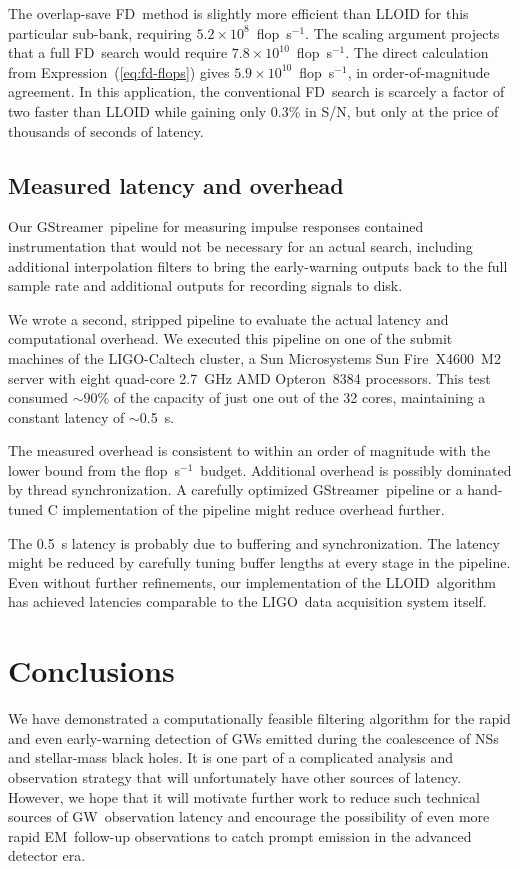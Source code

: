 \documentclass[preprint2]{aastex}
\newcommand{\NS}{NS}
\newcommand{\GW}{GW}%
\newcommand{\EM}{EM}%
\newcommand{\LIGO}{LIGO}%
\newcommand{\SNR}{S/N}%
\newcommand{\flops}{flop~s$^{-1}$}
\newcommand{\gstreamer}{GStreamer}
\newcommand{\lloid}{LLOID}%
\newcommand{\FD}{FD}%
\begin{document}
The overlap-save \FD\ method is slightly more efficient than LLOID for this particular sub-bank, requiring $5.2 \times 10^8$~\flops.  The scaling argument projects that a full \FD\ search would require $7.8 \times 10^{10}$~\flops.  The direct calculation from Expression~(\ref{eq:fd-flops}) gives $5.9 \times 10^{10}$~\flops, in order-of-magnitude agreement.  In this application, the conventional \FD\ search is scarcely a factor of two faster than LLOID while gaining only $0.3$\% in \SNR, but only at the price of thousands of seconds of latency.

\subsection{Measured latency and overhead}

Our \gstreamer\ pipeline for measuring impulse responses contained
instrumentation that would not be necessary for an actual search, including
additional interpolation filters to bring the early-warning outputs back to the
full sample rate and additional outputs for recording signals to disk.

We wrote a second, stripped pipeline to evaluate the actual latency and
computational overhead.  We executed this pipeline on one of the submit
machines of the \LIGO-Caltech cluster, a Sun Microsystems Sun
Fire\texttrademark\ X4600~M2 server with eight quad-core 2.7~GHz AMD
Opteron\texttrademark\ 8384 processors.  This test consumed $\sim$90\% of the
capacity of just one out of the 32 cores, maintaining a constant latency of
$\sim$0.5~s.

The measured overhead is consistent to within an order of magnitude with the
lower bound from the \flops\ budget.  Additional overhead is possibly
dominated by thread synchronization.  A carefully optimized \gstreamer\
pipeline or a hand-tuned C implementation of the pipeline might reduce overhead
further.

The 0.5~s latency is probably due to buffering and synchronization.  The latency
might be reduced by carefully tuning buffer lengths at every stage in the
pipeline.  Even without further refinements, our implementation of the \lloid\
algorithm has achieved latencies comparable to the \LIGO\ data acquisition
system itself.  

\section{Conclusions}

We have demonstrated a computationally feasible filtering algorithm for the rapid
and even early-warning detection of \GW{}s emitted during the coalescence
of \NS{}s and stellar-mass black holes.  It is one part of a complicated
analysis and observation strategy that will unfortunately have other sources of
latency.  However, we hope that it will motivate further work to reduce such
technical sources of \GW\ observation latency and encourage the possibility of
even more rapid \EM\ follow-up observations to catch prompt emission in the
advanced detector era.
\end{document}
